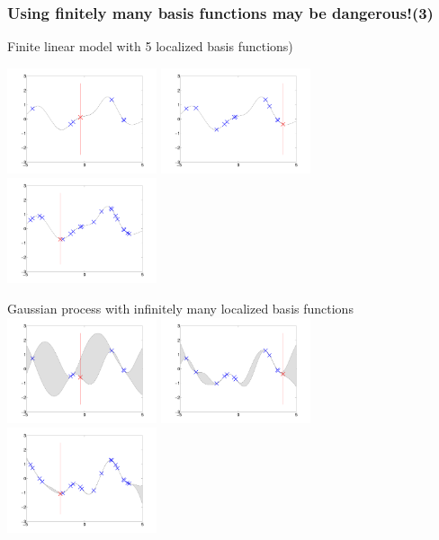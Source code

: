 \begin{frame}
\frametitle{\!\!\!Using finitely many basis functions may be dangerous!(3)}


Finite linear model with 5 localized basis functions)

\includegraphics[width=0.33\textwidth]{seq_linear_M7.pdf}
\includegraphics[width=0.33\textwidth]{seq_linear_M12.pdf}
\includegraphics[width=0.33\textwidth]{seq_linear_M20.pdf}

Gaussian process with infinitely many localized basis functions
\includegraphics[width=0.33\textwidth]{seq_fullGP_M7.pdf}
\includegraphics[width=0.33\textwidth]{seq_fullGP_M12.pdf}
\includegraphics[width=0.33\textwidth]{seq_fullGP_M20.pdf}


\end{frame}



